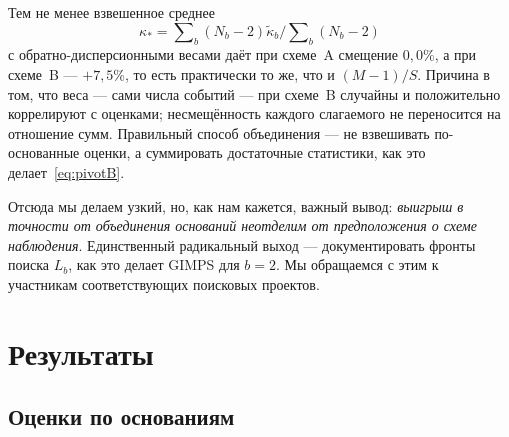 \documentclass[11pt,a4paper]{article}
\theoremstyle{plain}
\theoremstyle{remark}
\begin{document}
Тем не менее взвешенное среднее
$$\kappa_\ast=\sum\nolimits_b(N_b-2)\tilde\kappa_b\Big/\sum\nolimits_b(N_b-2)$$
с обратно-дисперсионными весами даёт при схеме~A смещение $0{,}0\%$,
а при схеме~B --- $+7{,}5\%$, то есть практически то же, что и $(M-1)/S$. Причина в том,
что веса --- сами числа событий --- при схеме~B случайны и положительно коррелируют с
оценками; несмещённость каждого слагаемого не переносится на отношение сумм.
Правильный способ объединения --- не взвешивать по-основанные оценки, а
суммировать достаточные статистики, как это делает~\eqref{eq:pivotB}.

Отсюда мы делаем узкий, но, как нам кажется, важный вывод: \emph{выигрыш в точности от
объединения оснований неотделим от предположения о схеме наблюдения}.
Единственный радикальный выход --- документировать фронты поиска $L_b$, как это делает
GIMPS для $b=2$. Мы обращаемся с этим к участникам соответствующих поисковых проектов.

\section{Результаты}\label{sec:results}

\subsection{Оценки по основаниям}
\end{document}
